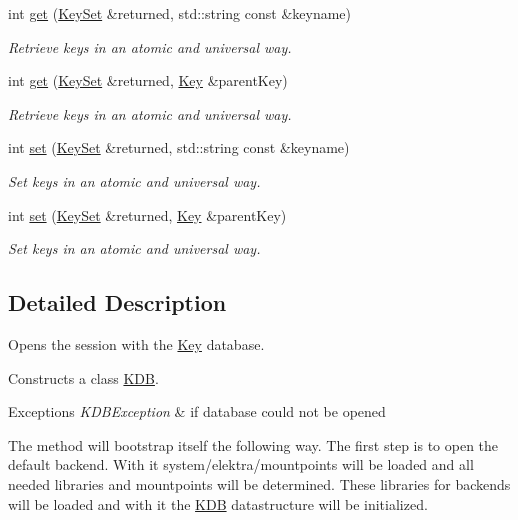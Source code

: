 \begin{DoxyCompactItemize}
int \hyperlink{classkdb_1_1KDB_a0419ffbc273c89756bc523b4223ec25a}{get} (\hyperlink{classkdb_1_1KeySet}{Key\-Set} \&returned, std\-::string const \&keyname)
\begin{DoxyCompactList}\small\item\em Retrieve keys in an atomic and universal way.  \end{DoxyCompactList}\item 
int \hyperlink{classkdb_1_1KDB_a48770a7290699bf2b7529f3ab67e378f}{get} (\hyperlink{classkdb_1_1KeySet}{Key\-Set} \&returned, \hyperlink{classkdb_1_1Key}{Key} \&parent\-Key)
\begin{DoxyCompactList}\small\item\em Retrieve keys in an atomic and universal way.  \end{DoxyCompactList}\item 
int \hyperlink{classkdb_1_1KDB_a29087a6a1a7de334f4e5b62ffe5d6e6e}{set} (\hyperlink{classkdb_1_1KeySet}{Key\-Set} \&returned, std\-::string const \&keyname)
\begin{DoxyCompactList}\small\item\em Set keys in an atomic and universal way.  \end{DoxyCompactList}\item 
int \hyperlink{classkdb_1_1KDB_a62a4fafbe21d9519b31a7868aa05f3e3}{set} (\hyperlink{classkdb_1_1KeySet}{Key\-Set} \&returned, \hyperlink{classkdb_1_1Key}{Key} \&parent\-Key)
\begin{DoxyCompactList}\small\item\em Set keys in an atomic and universal way.  \end{DoxyCompactList}\end{DoxyCompactItemize}


\subsection{Detailed Description}
Opens the session with the \hyperlink{classkdb_1_1Key}{Key} database.   

Constructs a class \hyperlink{classkdb_1_1KDB}{K\-D\-B}.


\begin{DoxyExceptions}{Exceptions}
{\em K\-D\-B\-Exception} & if database could not be opened\\
\hline
\end{DoxyExceptions}
The method will bootstrap itself the following way. The first step is to open the default backend. With it system/elektra/mountpoints will be loaded and all needed libraries and mountpoints will be determined. These libraries for backends will be loaded and with it the {\ttfamily \hyperlink{classkdb_1_1KDB}{K\-D\-B}} datastructure will be initialized.

